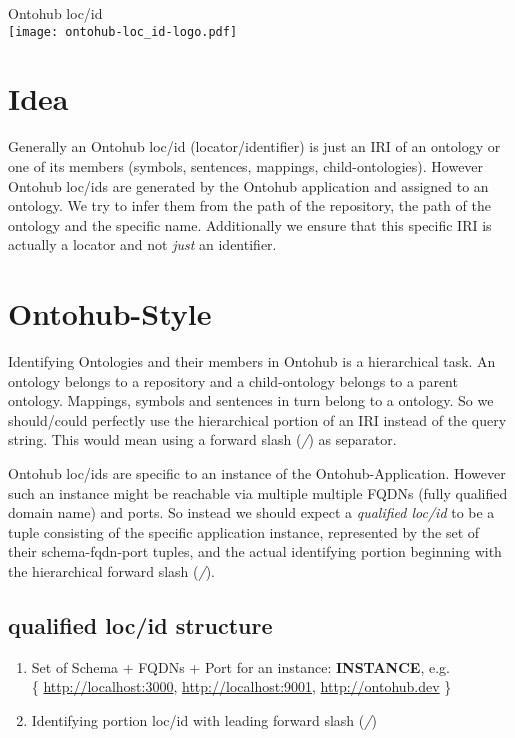 \documentclass[a4paper,11pt,DIV=25]{scrartcl}
\author{Tim Reddehase}
\date{2014-09-13}
\begin{document}
\Huge
\begin{center}
  Ontohub loc/id\\
  \bigskip
  \texttt{[image: ontohub-loc\_id-logo.pdf]}
\end{center}
\normalsize

\bigskip

\section{Idea}

Generally an Ontohub loc/id (locator/identifier) is just an IRI of an ontology
or one of its members (symbols, sentences, mappings, child-ontologies). However
Ontohub loc/ids are generated by the Ontohub application and assigned to an
ontology.  We try to infer them from the path of the repository, the path of
the ontology and the specific name. Additionally we ensure that this specific
IRI is actually a locator and not \textit{just} an identifier.

\section{Ontohub-Style}

Identifying Ontologies and their members in Ontohub is a hierarchical task. An
ontology belongs to a repository and a child-ontology belongs to a parent
ontology. Mappings, symbols and sentences in turn belong to a ontology. So we
should/could perfectly use the hierarchical portion of an IRI instead of the
query string. This would mean using a forward slash (\textit{/}) as separator.

Ontohub loc/ids are specific to an instance of the Ontohub-Application. However
such an instance might be reachable via multiple multiple FQDNs (fully
qualified domain name) and ports. So instead we should expect a
\textit{qualified loc/id} to be a tuple consisting of the specific application
instance, represented by the set of their schema-fqdn-port tuples, and the
actual identifying portion beginning with the hierarchical forward slash
(\textit{/}).

\subsection{qualified loc/id structure}

\begin{enumerate}
  \item Set of Schema + FQDNs + Port for an instance: \textbf{INSTANCE}, e.g.\\
    \{ \url{http://localhost:3000}, \url{http://localhost:9001}, \url{http://ontohub.dev} \}
  \item Identifying portion loc/id with leading forward slash (\textit{/})
\end{enumerate}
\end{document}
